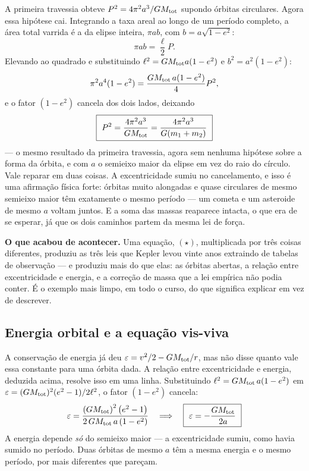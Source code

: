 \documentclass[11pt,a4paper]{article}
\begin{document}
A primeira travessia obteve $P^{2}=4\pi^{2}a^{3}/GM_{\rm tot}$ supondo órbitas circulares. Agora essa hipótese
cai. Integrando a taxa areal ao longo de um período completo, a área total varrida é a da elipse inteira,
$\pi ab$, com $b=a\sqrt{1-e^{2}}$:
\[
\pi a b=\frac{\ell}{2}P.
\]
Elevando ao quadrado e substituindo $\ell^{2}=GM_{\rm tot}a(1-e^{2})$ e $b^{2}=a^{2}(1-e^{2})$:
\[
\pi^{2}a^{4}(1-e^{2})=\frac{GM_{\rm tot}\,a(1-e^{2})}{4}P^{2},
\]
e o fator $(1-e^{2})$ cancela dos dois lados, deixando
\[
\boxed{\ P^{2}=\frac{4\pi^{2}a^{3}}{GM_{\rm tot}}=\frac{4\pi^{2}a^{3}}{G(m_1+m_2)}\ }
\]
--- o mesmo resultado da primeira travessia, agora sem nenhuma hipótese sobre a forma da órbita, e com $a$ o
semieixo maior da elipse em vez do raio do círculo. Vale reparar em duas coisas. A excentricidade sumiu no
cancelamento, e isso é uma afirmação física forte: órbitas muito alongadas e quase circulares de mesmo
semieixo maior têm exatamente o mesmo período --- um cometa e um asteroide de mesmo $a$ voltam juntos. E a
soma das massas reaparece intacta, o que era de se esperar, já que os dois caminhos partem da mesma lei de
força.

\begin{noticebox}
\textbf{O que acabou de acontecer.} Uma equação, $(\star)$, multiplicada por três coisas diferentes, produziu
as três leis que Kepler levou vinte anos extraindo de tabelas de observação --- e produziu mais do que elas:
as órbitas abertas, a relação entre excentricidade e energia, e a correção de massa que a lei empírica não
podia conter. É o exemplo mais limpo, em todo o curso, do que significa explicar em vez de descrever.
\end{noticebox}

\subsection*{Energia orbital e a equação vis-viva}

A conservação de energia já deu $\varepsilon=v^{2}/2-GM_{\rm tot}/r$, mas não disse quanto vale essa constante
para uma órbita dada. A relação entre excentricidade e energia, deduzida acima, resolve isso em uma linha.
Substituindo $\ell^{2}=GM_{\rm tot}\,a(1-e^{2})$ em
$\varepsilon=(GM_{\rm tot})^{2}(e^{2}-1)/2\ell^{2}$, o fator $(1-e^{2})$ cancela:
\[
\varepsilon=\frac{\left(GM_{\rm tot}\right)^{2}\left(e^{2}-1\right)}{2\,GM_{\rm tot}\,a\left(1-e^{2}\right)}
\quad\Longrightarrow\quad
\boxed{\ \varepsilon=-\frac{GM_{\rm tot}}{2a}\ }
\]
A energia depende \emph{só} do semieixo maior --- a excentricidade sumiu, como havia sumido no período. Duas
órbitas de mesmo $a$ têm a mesma energia e o mesmo período, por mais diferentes que pareçam.
\end{document}
